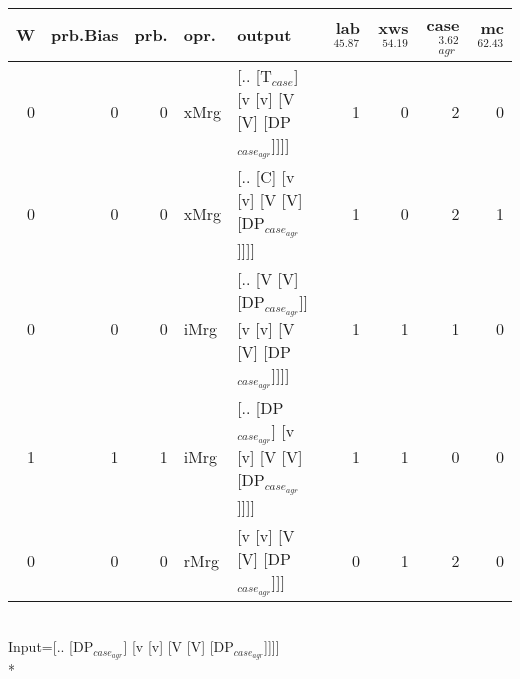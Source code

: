 \begin{tabularx}{\linewidth}{rrrlXrrrr}
\hline
   W &   prb.Bias &   prb. & opr.   & output                                                   &   lab$^{45.87}$ &   xws$^{54.19}$ &   case$_{agr}^{3.62}$ &   mc$^{62.43}$ \\
\hline
   0 &       0 &   0 & xMrg & [.. [T$_{case}$] [v [v] [V [V] [DP$_{case_{agr}}$]]]]              &             1 &             0 &                  2 &            0 \\
   0 &       0 &   0 & xMrg & [.. [C] [v [v] [V [V] [DP$_{case_{agr}}$]]]]                   &             1 &             0 &                  2 &            1 \\
   0 &       0 &   0 & iMrg & [.. [V [V] [DP$_{case_{agr}}$]] [v [v] [V [V] [DP$_{case_{agr}}$]]]] &             1 &             1 &                  1 &            0 \\
   1 &       1 &   1 & iMrg & [.. [DP$_{case_{agr}}$] [v [v] [V [V] [DP$_{case_{agr}}$]]]]         &             1 &             1 &                  0 &            0 \\
   0 &       0 &   0 & rMrg & [v [v] [V [V] [DP$_{case_{agr}}$]]]                            &             0 &             1 &                  2 &            0 \\
\hline
\end{tabularx}\endgroup\\
\begingroup\scriptsize Input=[.. [DP$_{case_{agr}}$] [v [v] [V [V] [DP$_{case_{agr}}$]]]]\\*
